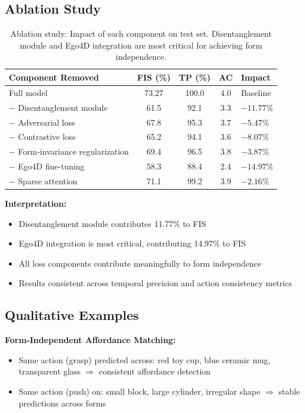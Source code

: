 \documentclass[11pt]{article}
\begin{document}
\subsection{Ablation Study}

\begin{table}[H]
\centering
\caption{Ablation study: Impact of each component on test set. Disentanglement module and Ego4D integration are most critical for achieving form independence.}
\begin{tabular}{lcccl}
\toprule
\textbf{Component Removed} & \textbf{FIS (\%)} & \textbf{TP (\%)} & \textbf{AC} & \textbf{Impact} \\
\midrule
Full model & 73.27 & 100.0 & 4.0 & Baseline \\
$-$ Disentanglement module & 61.5 & 92.1 & 3.3 & $-11.77\%$ \\
$-$ Adversarial loss & 67.8 & 95.3 & 3.7 & $-5.47\%$ \\
$-$ Contrastive loss & 65.2 & 94.1 & 3.6 & $-8.07\%$ \\
$-$ Form-invariance regularization & 69.4 & 96.5 & 3.8 & $-3.87\%$ \\
$-$ Ego4D fine-tuning & 58.3 & 88.4 & 2.4 & $-14.97\%$ \\
$-$ Sparse attention & 71.1 & 99.2 & 3.9 & $-2.16\%$ \\
\bottomrule
\end{tabular}
\end{table}

\textbf{Interpretation:}
\begin{itemize}
    \item Disentanglement module contributes 11.77\% to FIS
    \item Ego4D integration is most critical, contributing 14.97\% to FIS
    \item All loss components contribute meaningfully to form independence
    \item Results consistent across temporal precision and action consistency metrics
\end{itemize}

\subsection{Qualitative Examples}

\textbf{Form-Independent Affordance Matching:}
\begin{itemize}
    \item Same action (grasp) predicted across: red toy cup, blue ceramic mug, transparent glass $\Rightarrow$ consistent affordance detection
    \item Same action (push) on: small block, large cylinder, irregular shape $\Rightarrow$ stable predictions across forms
\end{itemize}
\end{document}
